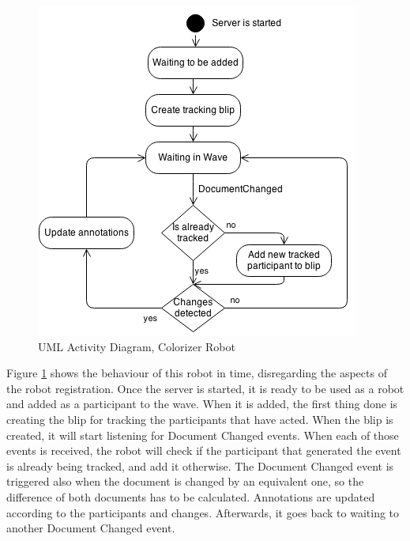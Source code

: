 \begin{figure}[H]
  \center
    \includegraphics[keepaspectratio, scale=0.65]{Media/Diagrams/Robot/RobotActivity.png}
  \caption{UML Activity Diagram, Colorizer Robot}
  \label{fig:colorizer_activity_diagram}
\end{figure}
Figure \ref{fig:colorizer_activity_diagram} shows the behaviour of this robot in time, disregarding the aspects of the robot registration. Once the server is started, it is ready to be used as a robot and added as a participant to the wave. When it is added, the first thing done is creating the blip for tracking the participants that have acted. When the blip is created, it will start listening for Document Changed events. When each of those events is received, the robot will check if the participant that generated the event is already being tracked, and add it otherwise. The Document Changed event is triggered also when the document is changed by an equivalent one, so the difference of both documents has to be calculated. Annotations are updated according to the participants and changes. Afterwards, it goes back to waiting to another Document Changed event.

